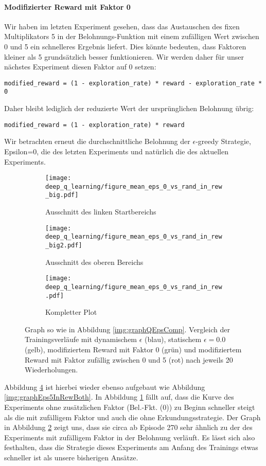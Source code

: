 \paragraph{Modifizierter Reward mit Faktor 0}
Wir haben im letzten Experiment gesehen, dass das Austauschen des fixen Multiplikators 5 in der Belohnungs-Funktion mit einem zufälligen Wert zwischen 0 und 5 ein schnelleres Ergebnis liefert. Dies könnte bedeuten, dass Faktoren kleiner als 5 grundsätzlich besser funktionieren. Wir werden daher für unser nächstes Experiment diesen Faktor auf 0 setzen:
\begin{verbatim}
modified_reward = (1 - exploration_rate) * reward - exploration_rate * 0
\end{verbatim}
Daher bleibt lediglich der reduzierte Wert der ursprünglichen Belohnung übrig:
\begin{verbatim}
modified_reward = (1 - exploration_rate) * reward
\end{verbatim}
Wir betrachten erneut die durchschnittliche Belohnung der $ \epsilon $-greedy Strategie, Epsilon=0, die des letzten Experiments und natürlich die des aktuellen Experiments.
\begin{figure}[h!]
    \centering
    \begin{subfigure}[b]{0.49\textwidth}
        \texttt{[image: deep\_q\_learning/figure\_mean\_eps\_0\_vs\_rand\_in\_rew\_big.pdf]}
        \caption{Ausschnitt des linken Startbereichs}
        \label{img:graphEps0VsRandInRewBig}
    \end{subfigure}
    \begin{subfigure}[b]{0.49\textwidth}
        \texttt{[image: deep\_q\_learning/figure\_mean\_eps\_0\_vs\_rand\_in\_rew\_big2.pdf]}
        \caption{Ausschnitt des oberen Bereichs}
        \label{img:graphEps0VsRandInRewBig2}
    \end{subfigure}
    \begin{subfigure}[b]{0.7\textwidth}
        \texttt{[image: deep\_q\_learning/figure\_mean\_eps\_0\_vs\_rand\_in\_rew.pdf]}
        \caption{Kompletter Plot}
        \label{img:graphEps0VsRandInRew}
    \end{subfigure}
    \caption{Graph so wie in Abbildung \ref{img:graphQEpsComp}. Vergleich der Trainingsverläufe mit dynamischem $ \epsilon $ (blau), statischem $ \epsilon = 0.0 $ (gelb), modifiziertem Reward mit Faktor 0 (grün) und modifiziertem Reward mit Faktor zufällig zwischen 0 und 5 (rot) nach jeweils 20 Wiederholungen.}
    \label{img:graphEps0VsRandInRewBoth}
\end{figure}
Abbildung \ref{img:graphEps0VsRandInRewBoth} ist hierbei wieder ebenso aufgebaut wie Abbildung \ref{img:graphEps5InRewBoth}. In Abbildung \ref{img:graphEps0VsRandInRewBig} fällt auf, dass die Kurve des Experiments ohne zusätzlichen Faktor (Bel.-Fkt. (0)) zu Beginn schneller steigt als die mit zufälligem Faktor und auch die ohne Erkundungsstrategie. Der Graph in Abbildung \ref{img:graphEps0VsRandInRewBig2} zeigt uns, dass sie circa ab Episode 270 sehr ähnlich zu der des Experiments mit zufälligem Faktor in der Belohnung verläuft. Es lässt sich also festhalten, dass die Strategie dieses Experiments am Anfang des Trainings etwas schneller ist als unsere bisherigen Ansätze.

